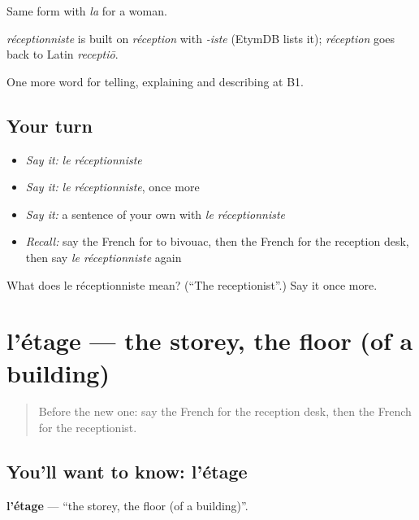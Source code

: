 Same form with \emph{la} for a woman.

\begin{cousinweb}
\emph{réceptionniste} is built on \emph{réception} with \emph{-iste} (EtymDB lists it); \emph{réception} goes back to Latin \emph{receptiō}.
\end{cousinweb}

\begin{grammarlens}[title={What you've built}]
One more word for telling, explaining and describing at B1.
\end{grammarlens}

\subsection*{Your turn}
\begin{itemize}
\raggedright
  \item \emph{Say it:} \emph{le réceptionniste}
  \item \emph{Say it:} \emph{le réceptionniste}, once more
  \item \emph{Say it:} a sentence of your own with \emph{le réceptionniste}
  \item \emph{Recall:} say the French for to bivouac, then the French for the reception desk, then say \emph{le réceptionniste} again
\end{itemize}

\begin{tcolorbox}[breakable,colback=teal!4,colframe=teal!35!black,title={Before you move on}]
What does le réceptionniste mean? (\textquotedblleft{}The receptionist\textquotedblright{}.) Say it once more.
\end{tcolorbox}
\section[l'étage]{l'étage — the storey, the floor (of a building)}

\label{lesson:FR-C426-etage}



\begin{quote}
Before the new one: say the French for the reception desk, then the French for the receptionist.
\end{quote}

\subsection*{You'll want to know: l'étage}
\textbf{l'étage} — \textquotedblleft{}the storey, the floor (of a building)\textquotedblright{}.

